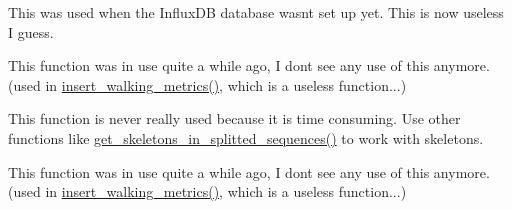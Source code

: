 
\begin{DoxyRefList}
\item[Member \mbox{\hyperlink{namespacefeet__analysis_a377b27d81535cb7ad52b7a2a08fd7666}{feet\+\_\+analysis.get\+\_\+data}} (str json\+\_\+filename)]\label{deprecated__deprecated000001}%
%
This was used when the Influx\+DB database wasn\textquotesingle{}t set up yet. This is now useless I guess. 
\item[Member \mbox{\hyperlink{classInfluxDB__connection_1_1ListicClientDB_a6508025197b9eeda9a0af817d0f8ca26}{Listic\+Client\+DB.get\+\_\+all\+\_\+pir\+\_\+timestamps}} (self)]\label{deprecated__deprecated000003}%
%
This function was in use quite a while ago, I don\textquotesingle{}t see any use of this anymore. (used in \mbox{\hyperlink{classInfluxDB__connection_1_1ListicClientDB_acf92629aab66720f827cb0a293abea00}{insert\+\_\+walking\+\_\+metrics()}}, which is a useless function...) 
\item[Member \mbox{\hyperlink{classInfluxDB__connection_1_1ListicClientDB_a14d6748d29762f77758edb64a9f971fa}{Listic\+Client\+DB.get\+\_\+all\+\_\+skeletons}} (self)]\label{deprecated__deprecated000002}%
%
This function is never really used because it is time consuming. Use other functions like \mbox{\hyperlink{classInfluxDB__connection_1_1ListicClientDB_a4c219c59431e28134b37d8739a90f7b3}{get\+\_\+skeletons\+\_\+in\+\_\+splitted\+\_\+sequences()}} to work with skeletons.  
\item[Member \mbox{\hyperlink{classInfluxDB__connection_1_1ListicClientDB_a96c184416db1289d47a378a640b8eb68}{Listic\+Client\+DB.get\+\_\+closest\+\_\+timestamp}} (self, float timestamp)]\label{deprecated__deprecated000004}%
%
This function was in use quite a while ago, I don\textquotesingle{}t see any use of this anymore. (used in \mbox{\hyperlink{classInfluxDB__connection_1_1ListicClientDB_acf92629aab66720f827cb0a293abea00}{insert\+\_\+walking\+\_\+metrics()}}, which is a useless function...) 
\end{DoxyRefList}